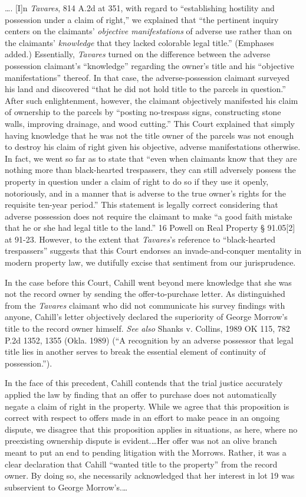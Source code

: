 \ldots. [I]n \textit{Tavares}, 814 A.2d at 351, with regard to ``establishing
hostility and possession under a claim of right,'' we explained that ``the
pertinent inquiry centers on the claimants' \textit{objective manifestations}
of adverse use rather than on the claimants' \textit{knowledge} that they
lacked colorable legal title.'' (Emphases added.) Essentially, \textit{Tavares}
turned on the difference between the adverse possession claimant's
``knowledge'' regarding the owner's title and his ``objective manifestations''
thereof. In that case, the adverse-possession claimant surveyed his land and
discovered ``that he did not hold title to the parcels in question.'' After
such enlightenment, however, the claimant objectively manifested his claim of
ownership to the parcels by ``posting no-trespass signs, constructing stone
walls, improving drainage, and wood cutting.'' This Court explained that simply
having knowledge that he was not the title owner of the parcels was not enough
to destroy his claim of right given his objective, adverse manifestations
otherwise. In fact, we went so far as to state that ``even when claimants know
that they are nothing more than black-hearted trespassers, they can still
adversely possess the property in question under a claim of right to do so if
they use it openly, notoriously, and in a manner that is adverse to the true
owner's rights for the requisite ten-year period.'' This statement is legally
correct considering that adverse possession does not require the claimant to
make ``a good faith mistake that he or she had legal title to the land.'' 16
Powell on Real Property {\S} 91.05[2] at 91-23. However, to the extent that
\textit{Tavares}'s reference to ``black-hearted trespassers'' suggests that
this Court endorses an invade-and-conquer mentality in modern property law, we
dutifully excise that sentiment from our jurisprudence.

In the case before this Court, Cahill went beyond mere knowledge that she was
not the record owner by sending the offer-to-purchase letter. As distinguished
from the \textit{Tavares} claimant who did not communicate his survey findings
with anyone, Cahill's letter objectively declared the superiority of George
Morrow's title to the record owner himself. \textit{See also} Shanks v.
Collins, 1989 OK 115, 782 P.2d 1352, 1355 (Okla. 1989) (``A recognition by an
adverse possessor that legal title lies in another serves to break the
essential element of continuity of possession.'').

In the face of this precedent, Cahill contends that the trial justice accurately
applied the law by finding that an offer to purchase does not automatically
negate a claim of right in the property. While we agree that this proposition
is correct with respect to offers made in an effort to make peace in an ongoing
dispute, we disagree that this proposition applies in situations, as here,
where no preexisting ownership dispute is evident.\ldots Her offer was not an
olive branch meant to put an end to pending litigation with the Morrows.
Rather, it was a clear declaration that Cahill ``wanted title to the property''
from the record owner. By doing so, she necessarily acknowledged that her
interest in lot 19 was subservient to George Morrow's.\ldots

